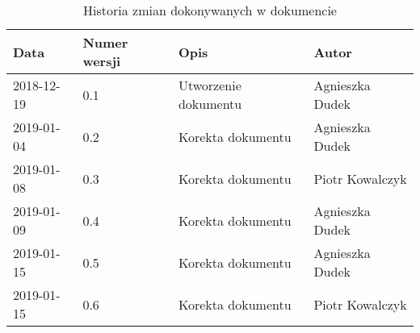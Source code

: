 \documentclass{article}
\begin{document}
\begin{titlepage}






\end{titlepage}

\addtocounter{page}{1}
\newpage

\begin{table}[h!]
	\begin{center}
		\caption{Historia zmian dokonywanych w dokumencie}
		\begin{tabular}{|l|l|l|l|}
			\hline
			Data & Numer wersji & Opis & Autor \\
			\hline \hline
			2018-12-19 & 0.1 & Utworzenie dokumentu & Agnieszka Dudek \\
			\hline
			2019-01-04 & 0.2 & Korekta dokumentu & Agnieszka Dudek \\
			\hline
			2019-01-08 & 0.3 & Korekta dokumentu & Piotr Kowalczyk \\
			\hline 
			2019-01-09 & 0.4 & Korekta dokumentu & Agnieszka Dudek \\
			\hline 
			2019-01-15 & 0.5 & Korekta dokumentu & Agnieszka Dudek \\
			\hline 
			2019-01-15 & 0.6 & Korekta dokumentu & Piotr Kowalczyk \\
			\hline 


    \end{tabular}
	\end{center}
\end{table}	
\end{document}
